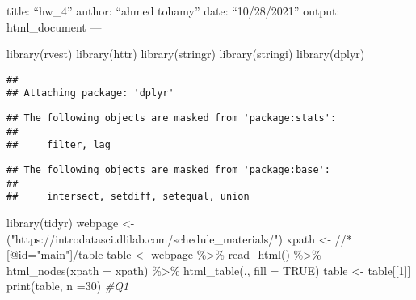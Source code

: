 \documentclass[
]{article}
\author{}
\date{\vspace{-2.5em}}
\newenvironment{Shaded}{\begin{snugshade}}{\end{snugshade}}
\newcommand{\AttributeTok}[1]{\textcolor[rgb]{0.77,0.63,0.00}{#1}}
\newcommand{\CommentTok}[1]{\textcolor[rgb]{0.56,0.35,0.01}{\textit{#1}}}
\newcommand{\ConstantTok}[1]{\textcolor[rgb]{0.00,0.00,0.00}{#1}}
\newcommand{\DecValTok}[1]{\textcolor[rgb]{0.00,0.00,0.81}{#1}}
\newcommand{\FunctionTok}[1]{\textcolor[rgb]{0.00,0.00,0.00}{#1}}
\newcommand{\NormalTok}[1]{#1}
\newcommand{\OtherTok}[1]{\textcolor[rgb]{0.56,0.35,0.01}{#1}}
\newcommand{\SpecialCharTok}[1]{\textcolor[rgb]{0.00,0.00,0.00}{#1}}
\newcommand{\StringTok}[1]{\textcolor[rgb]{0.31,0.60,0.02}{#1}}
\begin{document}
title: ``hw\_4'' author: ``ahmed tohamy'' date: ``10/28/2021'' output:
html\_document ---

\begin{Shaded}
\begin{Highlighting}[]
\FunctionTok{library}\NormalTok{(rvest)}
\FunctionTok{library}\NormalTok{(httr)}
\FunctionTok{library}\NormalTok{(stringr)}
\FunctionTok{library}\NormalTok{(stringi)}
\FunctionTok{library}\NormalTok{(dplyr)}
\end{Highlighting}
\end{Shaded}

\begin{verbatim}
## 
## Attaching package: 'dplyr'
\end{verbatim}

\begin{verbatim}
## The following objects are masked from 'package:stats':
## 
##     filter, lag
\end{verbatim}

\begin{verbatim}
## The following objects are masked from 'package:base':
## 
##     intersect, setdiff, setequal, union
\end{verbatim}

\begin{Shaded}
\begin{Highlighting}[]
\FunctionTok{library}\NormalTok{(tidyr)}
\NormalTok{webpage }\OtherTok{\textless{}{-}}\NormalTok{ (}\StringTok{"https://introdatasci.dlilab.com/schedule\_materials/"}\NormalTok{)}
\NormalTok{xpath }\OtherTok{\textless{}{-}} \StringTok{\textquotesingle{}//*[@id="main"]/table\textquotesingle{}}
\NormalTok{table }\OtherTok{\textless{}{-}}\NormalTok{ webpage }\SpecialCharTok{\%\textgreater{}\%}
\FunctionTok{read\_html}\NormalTok{() }\SpecialCharTok{\%\textgreater{}\%}
\FunctionTok{html\_nodes}\NormalTok{(}\AttributeTok{xpath =}\NormalTok{  xpath) }\SpecialCharTok{\%\textgreater{}\%}
\FunctionTok{html\_table}\NormalTok{(., }\AttributeTok{fill =} \ConstantTok{TRUE}\NormalTok{) }
\NormalTok{table }\OtherTok{\textless{}{-}}\NormalTok{ table[[}\DecValTok{1}\NormalTok{]]}
\FunctionTok{print}\NormalTok{(table, }\AttributeTok{n =}\DecValTok{30}\NormalTok{)  }\CommentTok{\#Q1}
\end{Highlighting}
\end{Shaded}
\end{document}
